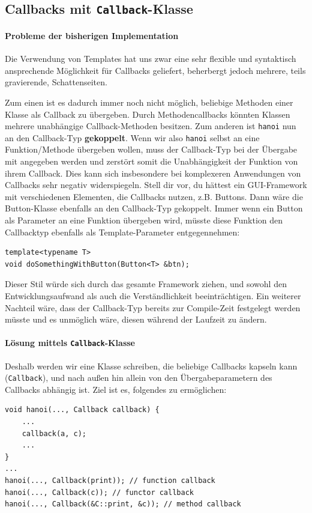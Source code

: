 \subsection{Callbacks mit \lstinline{Callback}-Klasse}

\paragraph*{Probleme der bisherigen Implementation}
Die Verwendung von Templates hat uns zwar eine sehr flexible und syntaktisch ansprechende Möglichkeit für Callbacks geliefert, beherbergt jedoch mehrere, teils gravierende, Schattenseiten.

Zum einen ist es dadurch immer noch nicht möglich, beliebige Methoden einer Klasse als Callback zu übergeben.
Durch Methodencallbacks könnten Klassen mehrere unabhängige Callback-Methoden besitzen.
Zum anderen ist \lstinline{hanoi} nun an den Callback-Typ \textbf{gekoppelt}. Wenn wir also \lstinline{hanoi} selbst an eine Funktion/Methode übergeben wollen, muss der Callback-Typ bei der Übergabe mit angegeben werden und zerstört somit die Unabhängigkeit der Funktion von ihrem Callback.
Dies kann sich insbesondere bei komplexeren Anwendungen von Callbacks sehr negativ widerspiegeln.
Stell dir vor, du hättest ein GUI-Framework mit verschiedenen Elementen, die Callbacks nutzen, z.B. Buttons.
Dann wäre die Button-Klasse ebenfalls an den Callback-Typ gekoppelt.
Immer wenn ein Button als Parameter an eine Funktion übergeben wird, müsste diese Funktion den Callbacktyp ebenfalls als Template-Parameter entgegennehmen:

\begin{lstlisting}
template<typename T>
void doSomethingWithButton(Button<T> &btn);
\end{lstlisting}

Dieser Stil würde sich durch das gesamte Framework ziehen, und sowohl den Entwicklungsaufwand als auch die Verständlichkeit beeinträchtigen.
Ein weiterer Nachteil wäre, dass der Callback-Typ bereits zur Compile-Zeit festgelegt werden müsste und es unmöglich wäre, diesen während der Laufzeit zu ändern.

\paragraph*{Lösung mittels \lstinline{Callback}-Klasse}

Deshalb werden wir eine Klasse schreiben, die beliebige Callbacks kapseln kann (\lstinline{Callback}), und nach außen hin allein von den Übergabeparametern des Callbacks abhängig ist. Ziel ist es, folgendes zu ermöglichen:
\begin{lstlisting}
void hanoi(..., Callback callback) {
	...
	callback(a, c);
	...
}
...
hanoi(..., Callback(print)); // function callback
hanoi(..., Callback(c)); // functor callback
hanoi(..., Callback(&C::print, &c)); // method callback
\end{lstlisting}

